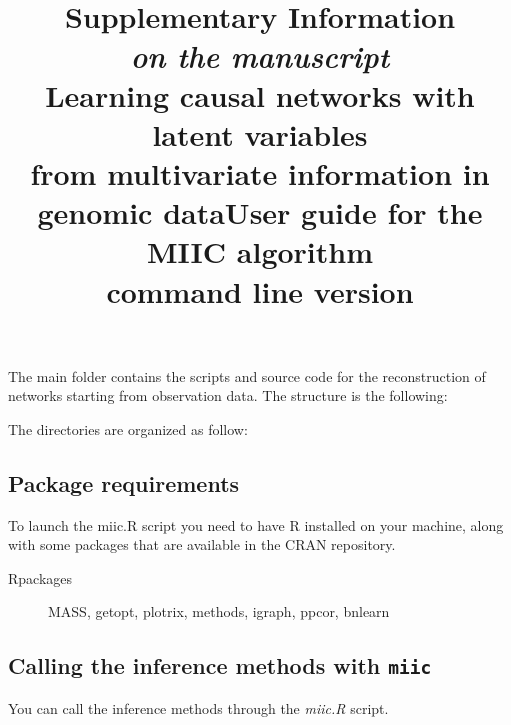 \documentclass[12pt]{article}
\title{Supplementary Information\\
{\small \em on the manuscript}\\
Learning causal networks with latent variables\\ from multivariate information in genomic data} %
\title{User guide for the MIIC algorithm\\command line version}
\begin{document}
\maketitle
\date{}

The main folder contains the scripts and source code for the reconstruction of networks starting from observation data. The structure is the following:


The directories are organized as follow:
\subsection*{Package requirements}
To launch the miic.R script you need to have R installed on your machine, along with some packages that are available in the CRAN repository. 
\begin{description}
		\item[Rpackages]	MASS, getopt, plotrix, methods, igraph, ppcor, bnlearn   
\end{description}
	
\subsection*{Calling the inference methods with {\tt miic}}

You can call the inference methods through the \textit{miic.R} script.
\end{document}
